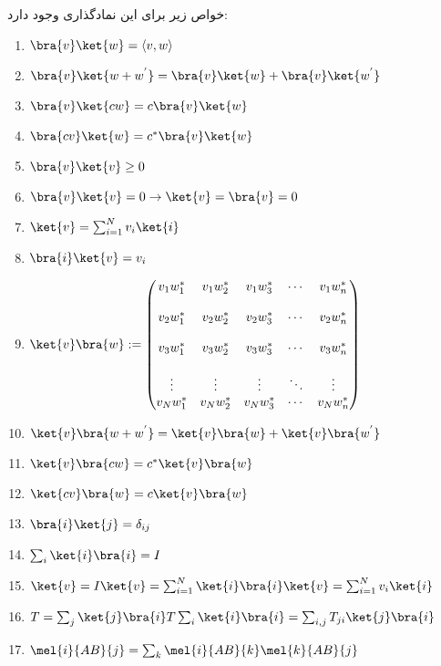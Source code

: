 خواص زیر برای این نمادگذاری وجود دارد:
 \begin{enumerate}
 	\item $\bra{v}\ket{w} = \langle v,w \rangle$
 	\item $\bra{v}\ket{w+w^{'}} = \bra{v}\ket{w} + \bra{v}\ket{w^{'}}$
 	\item $\bra{v}\ket{cw} = c\bra{v}\ket{w}$
 	\item $\bra{cv}\ket{w} = c^{*}\bra{v}\ket{w}$
 	\item $\bra{v}\ket{v} \geq 0$
 	\item $\bra{v}\ket{v} = 0 \rightarrow \ket{v} = \bra{v} = 0$
 	\item $\ket{v} = \sum_{i=1}^{N} v_{i}\ket{i}$
 	\item $\bra{i}\ket{v} = v_{i}$
 	\item $\ket{v}\bra{w} := \begin{pmatrix}
 		v_{1}w^{*}_{1} & v_{1}w^{*}_{2} & v_{1}w^{*}_{3} & \cdots & v_{1}w^{*}_{n} \\ 
 		\\
 		v_{2}w^{*}_{1} & v_{2}w^{*}_{2} & v_{2}w^{*}_{3} & \cdots & v_{2}w^{*}_{n} \\ 
 		\\
 		v_{3}w^{*}_{1} & v_{3}w^{*}_{2} & v_{3}w^{*}_{3} & \cdots & v_{3}w^{*}_{n} \\ 
 		\\
 		\vdots & \vdots & \vdots & \ddots & \vdots
		\\
 		v_{N}w^{*}_{1} & v_{N}w^{*}_{2} & v_{N}w^{*}_{3} & \cdots & v_{N}w^{*}_{n} \\ 

 	\end{pmatrix}$
 	\item $\ket{v}\bra{w+w^{'}} = \ket{v}\bra{w} + \ket{v}\bra{w^{'}}$
 	\item $\ket{v}\bra{cw} = c^{*}\ket{v}\bra{w}$
 	\item $\ket{cv}\bra{w} = c\ket{v}\bra{w}$
 	\item $\bra{i}\ket{j} = \delta_{ij}$
 	\item $\sum_{i} \ket{i}\bra{i} = I$
 	\item $\ket{v} = I\ket{v} = \sum_{i=1}^{N}  \ket{i}\bra{i}\ket{v} = \sum_{i=1}^{N} v_{i}\ket{i}$
 	\item $T = \sum_{j} \ket{j}\bra{i}T\sum_{i} \ket{i}\bra{i}  = \sum_{i,j}T_{ji}\ket{j}\bra{i}$
 	\item $\mel{i}{AB}{j} = \sum_{k} \mel{i}{AB}{k} \mel{k}{AB}{j} $
 \end{enumerate}
